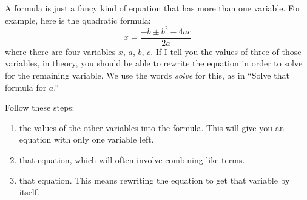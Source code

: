 \documentclass[fleqn,letterpaper,12pt,printwatermark=false]{memoir}
\begin{document}


\begin{myLesson}[][]
    A formula is just a fancy kind of equation that has more than one variable.
    For example, here is the quadratic formula:
    \[
        x = 
        \frac{
            - b 
            \pm
            b^2 - 4ac
        }
        {
            2a
        }
    \]
    where there are four variables $x$, $a$, $b$, $c$.
    If I tell you the values of three of those variables,
    in theory, you should be able to rewrite the equation 
    in order to solve for the remaining variable.
    We use the words \emph{solve} for this, as in 
    ``Solve that formula for $a$.''
\end{myLesson}

\begin{myKeyConcepts}
    Follow these steps:
    \begin{enumerate}
        \item {} the values of the other variables into the formula.
        This will give you an equation with only one variable left.
        \item {} that equation, which will often involve combining like terms.
        \item {} that equation. This means rewriting the equation to get that variable by itself.
    \end{enumerate}
\end{myKeyConcepts}


\end{document}
